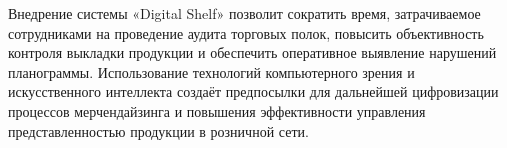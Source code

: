 {  \par \redline Внедрение системы «Digital Shelf» позволит сократить время,
  затрачиваемое сотрудниками на проведение аудита торговых полок, повысить
  объективность контроля выкладки продукции и обеспечить оперативное выявление
  нарушений планограммы. Использование технологий компьютерного зрения и
  искусственного интеллекта создаёт предпосылки для дальнейшей цифровизации
  процессов мерчендайзинга и повышения эффективности управления представленностью
  продукции в розничной сети.

  \par
}

\setcounter{subchaptercntr}{1}
\setcounter{formulacntr}{1}
\setcounter{imagecntr}{1}